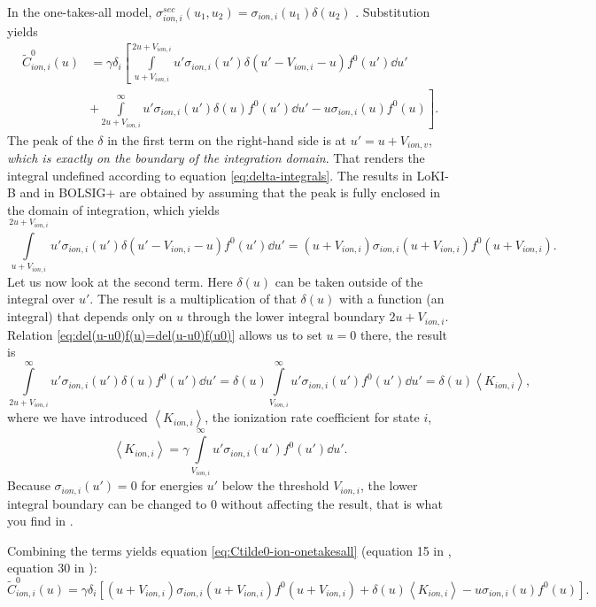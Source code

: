 \documentclass{book}
\newcommand{\MEAN}[1]{\ensuremath{\!\left\langle{{#1}}\right\rangle}}
\begin{document}
In the one-takes-all model, $\sigma_{ion,i}^{sec}(u_1,u_2)=\sigma_{ion,i}(u_1)\delta(u_2)$
\cite[above eq. 15]{Manual_2_2_0}.
Substitution yields
\begin{align}
	\tilde{C}^0_{ion,i}(u)
	&=\gamma\delta_i\left[
		 \int\limits_{u+V_{ion,i}}^{2u+V_{ion,i}}u'\sigma_{ion,i}(u')\delta(u'-V_{ion,i}-u)f^0(u')\dd{u'}
		\right.
	\nonumber \\
		&+\left.
		\int\limits_{2u+V_{ion,i}}^{\infty}u'\sigma_{ion,i}(u')\delta(u)f^0(u')\dd{u'}
		-
		u\sigma_{ion,i}(u)f^0(u)
	\right].
\end{align}
The peak of the $\delta$ in the first term on the right-hand side is at $u'=u+V_{ion,v}$,
{\em which is exactly on the boundary of the integration domain}. That renders the
integral undefined according to equation \eqref{eq:delta-integrals}. The results in
LoKI-B \cite[eq. 15, 1st term]{Manual_2_2_0} and in BOLSIG+ \cite[eq. 30, 2nd term]{Hagelaar2005}
are obtained by assuming that the peak is fully enclosed in the domain of integration,
which yields
\begin{equation}
	\int\limits_{u+V_{ion,i}}^{2u+V_{ion,i}}u'\sigma_{ion,i}(u')\delta(u'-V_{ion,i}-u)f^0(u')\dd{u'}
	=
	(u+V_{ion,i})\sigma_{ion,i}(u+V_{ion,i})f^0(u+V_{ion,i}).
\end{equation}
Let us now look at the second term. Here $\delta(u)$ can be taken outside of the integral over
$u'$. The result is a multiplication of that $\delta(u)$ with a function (an integral) that
depends only on $u$ through the lower integral boundary $2u+V_{ion,i}$. Relation
\eqref{eq:del(u-u0)f(u)=del(u-u0)f(u0)} allows us to set $u=0$ there, the result is
\begin{equation}
	\int\limits_{2u+V_{ion,i}}^{\infty}u'\sigma_{ion,i}(u')\delta(u)f^0(u')\dd{u'}
	= \delta(u)\int\limits_{V_{ion,i}}^{\infty}u'\sigma_{ion,i}(u')f^0(u')\dd{u'}
	= \delta(u)\MEAN{K_{ion,i}},
\end{equation}
where we have introduced $\MEAN{K_{ion,i}}$, the ionization rate coefficient for state $i$,
\[
	\MEAN{K_{ion,i}} = \gamma\int\limits_{V_{ion,i}}^{\infty}u'\sigma_{ion,i}(u')f^0(u')\dd{u'}.
\]
Because $\sigma_{ion,i}(u')=0$ for energies $u'$ below the threshold $V_{ion,i}$,
the lower integral boundary can be changed to 0 without affecting the result,
that is what you find in \cite[eq. 30, last term]{Hagelaar2005}.

Combining the terms yields equation \eqref{eq:Ctilde0-ion-onetakesall}
(equation 15 in \cite{Manual_2_2_0}, equation 30 in \cite{Hagelaar2005}):
\[
	\tilde{C}^0_{ion,i}(u)
	=\gamma\delta_i\left[
		(u+V_{ion,i})\sigma_{ion,i}(u+V_{ion,i})f^0(u+V_{ion,i})
		+
		\delta(u)\MEAN{K_{ion,i}}
		-
		u\sigma_{ion,i}(u)f^0(u)
	\right].
\]
\end{document}
